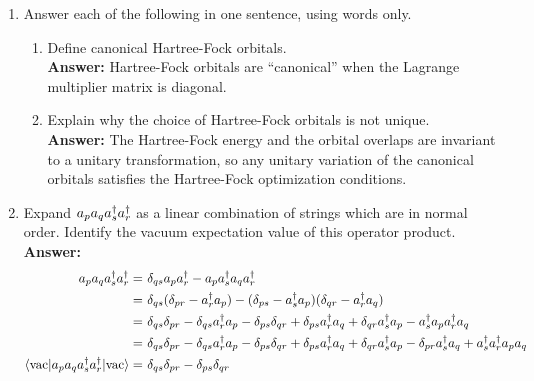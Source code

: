\documentclass[11pt]{article}
\numberwithin{equation}{section}
\begin{document}
\begin{enumerate}
\item
  Answer each of the following in one sentence, using words only.
  \begin{enumerate}
  \item
    Define canonical Hartree-Fock orbitals.\\
    \textbf{Answer:}
    Hartree-Fock orbitals are ``canonical'' when the Lagrange multiplier matrix is diagonal.
  \item
    Explain why the choice of Hartree-Fock orbitals is not unique.\\
    \textbf{Answer:}
    The Hartree-Fock energy and the orbital overlaps are invariant to a unitary transformation, so any unitary variation of the canonical orbitals satisfies the Hartree-Fock optimization conditions.
  \end{enumerate}

\item
  Expand $a_pa_qa_s^\dagger a_r^\dagger$ as a linear combination of strings which are in normal order.
  Identify the vacuum expectation value of this operator product.\\
  \textbf{Answer:}
  \begin{align*}
    a_p a_q a_s^\dagger a_r^\dagger
  =&\
    \delta _{qs} a_p a_r^\dagger
  -
    a_p a_s^\dagger a_q a_r^\dagger
  \\=&\
    \delta _{qs} (\delta _{pr} - a_r^\dagger a_p)
  -
    (\delta _{ps} - a_s^\dagger a_p)(\delta _{qr} - a_r^\dagger a_q)
  \\=&\
    \delta _{qs} \delta _{pr}
  -
    \delta _{qs} a_r^\dagger a_p
  -
    \delta _{ps}\delta _{qr}
  +
    \delta _{ps} a_r^\dagger a_q
  +
    \delta _{qr} a_s^\dagger a_p
  -
    a_s^\dagger a_p a_r^\dagger a_q
  \\=&\
    \delta _{qs} \delta _{pr}
  -
    \delta _{qs} a_r^\dagger a_p
  -
    \delta _{ps}\delta _{qr}
  +
    \delta _{ps} a_r^\dagger a_q
  +
    \delta _{qr} a_s^\dagger a_p
  -
    \delta _{pr} a_s^\dagger a_q
  +
    a_s^\dagger a_r^\dagger a_p a_q
  \\
    \langle\mathrm{vac}|a_p a_q a_s^\dagger a_r^\dagger|\mathrm{vac}\rangle
  =&\
    \delta _{qs} \delta _{pr}
  -
    \delta _{ps}\delta _{qr}
  \end{align*}


\end{enumerate}
\end{document}
